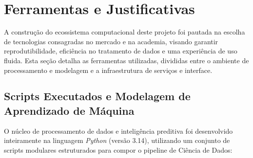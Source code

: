 \documentclass[12pt, a4paper]{article}
\begin{document}
\section{Ferramentas e Justificativas}

A construção do ecossistema computacional deste projeto foi pautada na escolha de tecnologias consagradas no mercado e na academia, visando garantir reprodutibilidade, eficiência no tratamento de dados e uma experiência de uso fluida. Esta seção detalha as ferramentas utilizadas, divididas entre o ambiente de processamento e modelagem e a infraestrutura de serviços e interface.

\subsection{Scripts Executados e Modelagem de Aprendizado de Máquina}

O núcleo de processamento de dados e inteligência preditiva foi desenvolvido inteiramente na linguagem \textit{Python} (versão 3.14), utilizando um conjunto de scripts modulares estruturados para compor o pipeline de Ciência de Dados:
\end{document}
